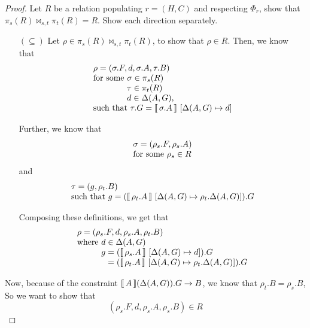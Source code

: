\begin{proof}
  Let $R$ be a relation populating $r = (H,C)$ and respecting $\Phi_r$, show
  that $\pi_s(R) \bowtie_{s,t} \pi_t(R) = R$. Show each direction
  separately.
  \begin{enumerate}[align=left]
  \item[$(\subseteq)$] Let $\rho \in \pi_s(R) \bowtie_{s,t} \pi_t(R)$,
    to show that $\rho \in R$. Then, we know that
    \[\begin{array}l
        \rho = (\sigma.F, d, \sigma.A, \tau.B)\\
        \text{for some } \sigma \in \pi_s(R)\\
        \phantom{\text{for some }}\tau \in \pi_t(R)\\
        \phantom{\text{for some }}d \in \Delta(A, G),\\
        \text{such that } \tau.G = \bracbb{\sigma.A}~[\Delta(A,G) \mapsto d]
      \end{array} \]

    Further, we know that
    \[\begin{array}l
        \sigma = (\rho_s.F, \rho_s.A)\\
        \text{for some } \rho_s \in R\\
      \end{array}
    \]
    and
    \[\begin{array}l  
        \tau = (g, \rho_t.B) \\
        \text{such that } g = (\bracbb{\rho_t.A}~[\Delta(A,G) \mapsto \rho_t.\Delta(A,G)]).G
      \end{array}\]

    Composing these definitions, we get that
    \[\begin{array}l
        \rho = (\rho_s.F, d, \rho_s.A, \rho_t.B) \\
        \text{where } d \in \Delta(A, G)\\
        \phantom{\text{where }} g = (\bracbb{\rho_s.A}~[\Delta(A,G) \mapsto d]).G\\
        \phantom{\text{where } g} = (\bracbb{\rho_t.A}~[\Delta(A,G) \mapsto \rho_t.\Delta(A,G)]).G
      \end{array}\]
    
  \end{enumerate}

  Now, because of the constraint $\llbracket\,A\,\rrbracket(\Delta(A,G)).G \to B$, we
  know that $\rho_t.B = \rho_s.B$, So we want to show
  that \[(\rho_s.F, d, \rho_s.A, \rho_s.B) \in R\]


\end{proof}
